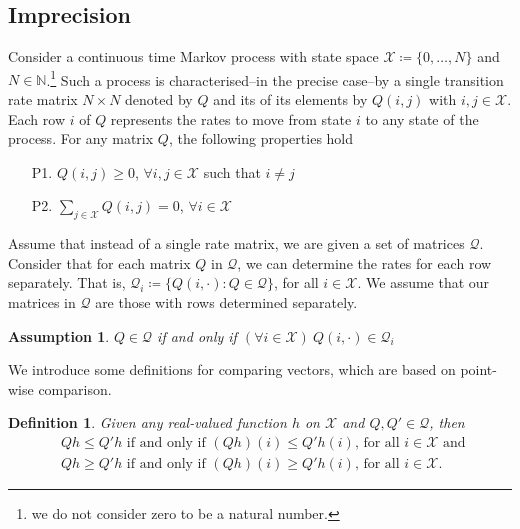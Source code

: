 \documentclass{article}
\newcommand{\nats}{\mathbb{N}}
\newcommand{\statessymbol}{\mathcal{X}}
\newcommand{\matrices}{\mathcal{Q}}
\newcommand{\stateset}{\statessymbol}
\newtheorem{Definition}{Definition}
\newtheorem{Assumption}{Assumption}
\begin{document}
\subsection{Imprecision}

Consider a continuous time Markov process with state space $\stateset\coloneqq\{0,\ldots,N\}$ and $N\in\nats$.\footnote{we do not consider zero to be a natural number.}
Such a process is characterised--in the precise case--by a single transition rate matrix $N\times N$ denoted by $Q$ and its of its elements by $Q(i,j)$ with $i,j\in\stateset$.
Each row $i$ of $Q$ represents the rates to move from state $i$ to any state of the process.
For any matrix $Q$, the following properties hold
\begin{itemize}
\item[P1.]$Q(i,j)\geq0$, $\forall i,j\in\stateset$ such that $i\neq j$
\item[P2.]$\sum_{j\in\stateset}Q(i,j)=0$, $\forall i\in\stateset$
\end{itemize}
Assume that instead of a single rate matrix, we are given a set of matrices $\matrices$.
Consider that for each matrix $Q$ in $\matrices$, we can determine the rates for each row separately.
That is, $\matrices_{i}\coloneqq\{Q(i,\cdot):Q\in\matrices\}$, for all $i\in\stateset$.
We assume that our matrices in $\matrices$ are those with rows determined separately.
\begin{Assumption} \label{ass:rates}
$Q\in\matrices$ if and only if $(\forall i\in\stateset) \ Q(i,\cdot)\in\matrices_{i}$
\end{Assumption}
We introduce some definitions for comparing vectors, which are based on point-wise comparison.
\begin{Definition} \label{def:leq_qh}
Given any real-valued function $h$ on $\stateset$ and $ Q, Q' \in \matrices$, then 
\begin{equation*}
\begin{split}
& Qh\leq  Q'h \text{ if and only if }  (Qh)(i)\leq  Q'h(i) \text{, for all } i\in\stateset
\text{ and }\\
& Qh\geq  Q'h \text{ if and only if }  (Qh)(i)\geq  Q'h(i) \text{, for all } i\in\stateset.
\end{split}
\end{equation*}
\end{Definition}
\end{document}
